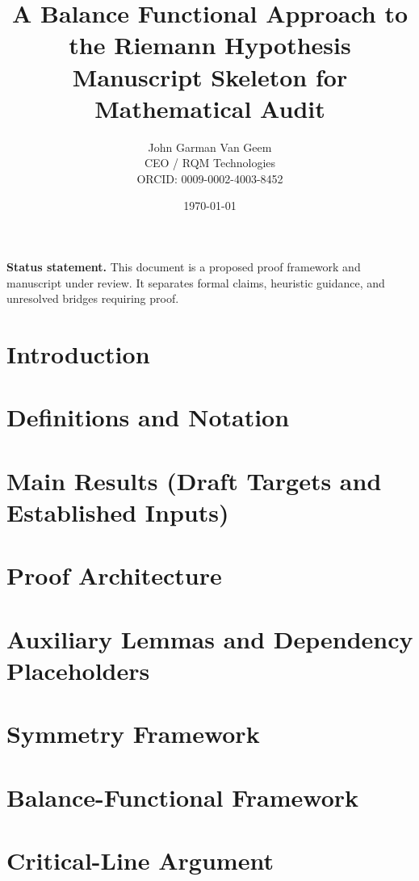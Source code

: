 \documentclass[11pt]{article}
\title{A Balance Functional Approach to the Riemann Hypothesis\\\large Manuscript Skeleton for Mathematical Audit}
\author{John Garman Van Geem\\CEO / RQM Technologies\\ORCID: 0009-0002-4003-8452}
\date{\today}
\theoremstyle{plain}
\theoremstyle{definition}
\begin{document}
\maketitle

\begin{abstract}

\end{abstract}

\noindent\textbf{Status statement.} This document is a proposed proof framework and manuscript under review. It separates formal claims, heuristic guidance, and unresolved bridges requiring proof.

\tableofcontents
\newpage

\section{Introduction}


\section{Definitions and Notation}


\section{Main Results (Draft Targets and Established Inputs)}


\section{Proof Architecture}


\section{Auxiliary Lemmas and Dependency Placeholders}


\section{Symmetry Framework}


\section{Balance-Functional Framework}


\section{Critical-Line Argument}

\end{document}
